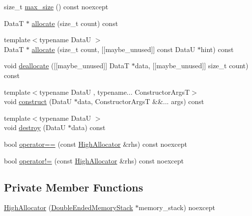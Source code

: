 \begin{DoxyCompactItemize}
\item 
size\+\_\+t \hyperlink{structmage_1_1_double_ended_memory_stack_1_1_high_allocator_a6adfd0ed341c637ce0d0edc9d3d02c27}{max\+\_\+size} () const noexcept
\item 
DataT $\ast$ \hyperlink{structmage_1_1_double_ended_memory_stack_1_1_high_allocator_ab6585eebb7bb11dcee1945b11b50ea98}{allocate} (size\+\_\+t count) const
\item 
{\footnotesize template$<$typename DataU $>$ }\\DataT $\ast$ \hyperlink{structmage_1_1_double_ended_memory_stack_1_1_high_allocator_aa7dd068405263cadbe9ecaeffa5a6500}{allocate} (size\+\_\+t count, \mbox{[}\mbox{[}maybe\+\_\+unused\mbox{]}\mbox{]} const DataU $\ast$hint) const
\item 
void \hyperlink{structmage_1_1_double_ended_memory_stack_1_1_high_allocator_ac03c8e0dff549f8765b3591c9c671d58}{deallocate} (\mbox{[}\mbox{[}maybe\+\_\+unused\mbox{]}\mbox{]} DataT $\ast$data, \mbox{[}\mbox{[}maybe\+\_\+unused\mbox{]}\mbox{]} size\+\_\+t count) const
\item 
{\footnotesize template$<$typename DataU , typename... Constructor\+ArgsT$>$ }\\void \hyperlink{structmage_1_1_double_ended_memory_stack_1_1_high_allocator_ae52a710da5593ac53d57c249f451bec6}{construct} (DataU $\ast$data, Constructor\+ArgsT \&\&... args) const
\item 
{\footnotesize template$<$typename DataU $>$ }\\void \hyperlink{structmage_1_1_double_ended_memory_stack_1_1_high_allocator_a59a29334c0812bf6037ebb74361e0598}{destroy} (DataU $\ast$data) const
\item 
bool \hyperlink{structmage_1_1_double_ended_memory_stack_1_1_high_allocator_af4a65b4f897a32ea1ddbe92dbea968f1}{operator==} (const \hyperlink{structmage_1_1_double_ended_memory_stack_1_1_high_allocator}{High\+Allocator} \&rhs) const noexcept
\item 
bool \hyperlink{structmage_1_1_double_ended_memory_stack_1_1_high_allocator_a824b84ed67215c42e573508e065f9507}{operator!=} (const \hyperlink{structmage_1_1_double_ended_memory_stack_1_1_high_allocator}{High\+Allocator} \&rhs) const noexcept
\end{DoxyCompactItemize}
\subsection*{Private Member Functions}
\begin{DoxyCompactItemize}
\item 
\hyperlink{structmage_1_1_double_ended_memory_stack_1_1_high_allocator_a6d51325f813c70290379dcb472d093c3}{High\+Allocator} (\hyperlink{classmage_1_1_double_ended_memory_stack}{Double\+Ended\+Memory\+Stack} $\ast$memory\+\_\+stack) noexcept
\end{DoxyCompactItemize}
